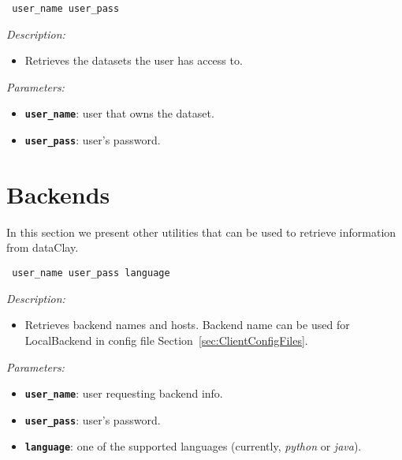 \begin{dBox}
\texttt{ \newline user\_name user\_pass}
\LINE

{\it Description:}

\begin{itemize}
    \item Retrieves the datasets the user has access to.
\end{itemize}

{\it Parameters:}

\begin{itemize}
    \item \texttt{\bfseries user\_name}: user that owns the dataset.
    \item \texttt{\bfseries user\_pass}: user's password.
\end{itemize}

\end{dBox}


\section{Backends}

In this section we present other utilities that can be used to retrieve information from dataClay.


\begin{dBox}
\texttt{ user\_name user\_pass language}
\LINE

{\it Description:}

\begin{itemize}
    \item Retrieves backend names and hosts. Backend name can be used for LocalBackend in config file Section~\ref{sec:ClientConfigFiles}.
\end{itemize}

{\it Parameters:}

\begin{itemize}
    \item \texttt{\bfseries user\_name}: user requesting backend info.
    \item \texttt{\bfseries user\_pass}: user's password.
    \item \texttt{\bfseries language}: one of the supported languages (currently, \textit{python} or \textit{java}).
\end{itemize}

\end{dBox}
